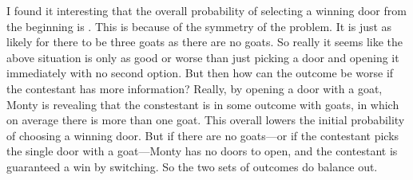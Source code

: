 \documentclass{article}
\begin{document}
I found it interesting that the overall probability of selecting a winning door from the beginning is .
This is because of the symmetry of the problem.
It is just as likely for there to be three goats as there are no goats.
So really it seems like the above situation is only as good or worse than just picking a door and opening it immediately with no second option.
But then how can the outcome be worse if the contestant has more information?
Really, by opening a door with a goat, Monty is revealing that the constestant is in some outcome with goats, in which on average there is more than one goat.
This overall lowers the initial probability of choosing a winning door.
But if there are no goats---or if the contestant picks the single door with a goat---Monty has no doors to open, and the contestant is guaranteed a win by switching.
So the two sets of outcomes do balance out.
\end{document}
